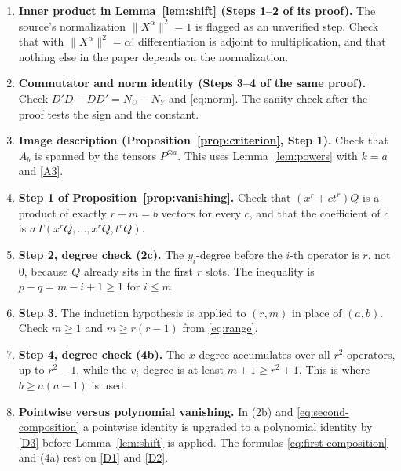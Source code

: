 \documentclass[11pt]{article}
\theoremstyle{remark}
\begin{document}
\begin{enumerate}[leftmargin=2em]
\item \textbf{Inner product in Lemma~\ref{lem:shift} (Steps 1--2 of its
 proof).} The source's normalization $\|X^\alpha\|^2=1$ is flagged as an
 unverified step. Check that with $\|X^\alpha\|^2=\alpha!$ differentiation
 is adjoint to multiplication, and that nothing else in the paper depends
 on the normalization.
\item \textbf{Commutator and norm identity (Steps 3--4 of the same proof).}
 Check $D'D-DD'=N_U-N_Y$ and \eqref{eq:norm}. The sanity check after the
 proof tests the sign and the constant.
\item \textbf{Image description (Proposition~\ref{prop:criterion}, Step 1).}
 Check that $A_b$ is spanned by the tensors $P^{\otimes a}$. This uses
 Lemma~\ref{lem:powers} with $k=a$ and \ref{A3}.
\item \textbf{Step 1 of Proposition~\ref{prop:vanishing}.} Check that
 $(x^r+ct^r)Q$ is a product of exactly $r+m=b$ vectors for every $c$, and
 that the coefficient of $c$ is $a\,T(x^rQ,\ldots,x^rQ,t^rQ)$.
\item \textbf{Step 2, degree check (2c).} The $y_i$-degree before the $i$-th
 operator is $r$, not $0$, because $Q$ already sits in the first $r$
 slots. The inequality is $p-q=m-i+1\ge1$ for $i\le m$.
\item \textbf{Step 3.} The induction hypothesis is applied to $(r,m)$ in
 place of $(a,b)$. Check $m\ge1$ and $m\ge r(r-1)$ from \eqref{eq:range}.
\item \textbf{Step 4, degree check (4b).} The $x$-degree accumulates over
 all $r^2$ operators, up to $r^2-1$, while the $v_i$-degree is at least
 $m+1\ge r^2+1$. This is where $b\ge a(a-1)$ is used.
\item \textbf{Pointwise versus polynomial vanishing.} In (2b) and
 \eqref{eq:second-composition} a pointwise identity is upgraded to a
 polynomial identity by \ref{D3} before Lemma~\ref{lem:shift} is applied.
 The formulas \eqref{eq:first-composition} and (4a) rest on \ref{D1} and
 \ref{D2}.
\end{enumerate}
\end{document}
